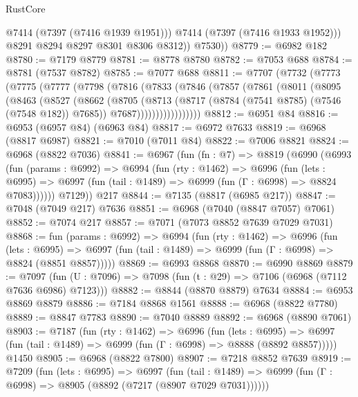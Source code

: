 \begin{lexlean}{RustCore}
\begin{coremodule}
                @7414
                (@7397 (@7416 @1939 @1951)))
              @7414
              (@7397 (@7416 @1933 @1952)))
            @8291
            @8294
            @8297
            @8301
            @8306
            @8312))
        @7530))
@8779 := @6982 @182
@8780 := @7179 @8779
@8781 := @8778 @8780
@8782 := @7053 @688
@8784 := @8781 (@7537 @8782)
@8785 := @7077 @688
@8811 := @7707
    (@7732
      (@7773
        (@7775
          (@7777
            (@7798
              (@7816
                (@7833
                  (@7846
                    (@7857
                      (@7861
                        (@8011
                          (@8095
                            (@8463
                              (@8527
                                (@8662
                                  (@8705
                                    (@8713
                                      (@8717 (@8784 (@7541 @8785) (@7546 (@7548 @182)) @7685))
                                      @7687)))))))))))))))))
@8812 := @6951 @84
@8816 := @6953 (@6957 @84) (@6963 @84)
@8817 := @6972 @7633
@8819 := @6968 (@8817 @6987)
@8821 := @7010 (@7011 @84)
@8822 := @7006 @8821
@8824 := @6968 (@8822 @7036)
@8841 := @6967
    (fun (fn : @7) =>
    @8819
      (@6990
        (@6993
          (fun (params : @6992) =>
          @6994
            (fun (rty : @1462) =>
            @6996
              (fun (lets : @6995) =>
              @6997 (fun (tail : @1489) => @6999 (fun (Γ : @6998) => @8824 @7083))))))
        @7129))
    @217
@8844 := @7135 (@8817 (@6985 @217))
@8847 := @7048 (@7049 @217) @7636
@8851 := @6968 (@7040 (@8847 @7057) @7061)
@8852 := @7074 @217
@8857 := @7071 (@7073 @8852 @7639 @7029 @7031)
@8868 := fun (params : @6992) =>
  @6994
    (fun (rty : @1462) =>
    @6996
      (fun (lets : @6995) =>
      @6997 (fun (tail : @1489) => @6999 (fun (Γ : @6998) => @8824 (@8851 @8857)))))
@8869 := @6993 @8868
@8870 := @6990 @8869
@8879 := @7097 (fun (U : @7096) => @7098 (fun (t : @29) => @7106 (@6968 (@7112 @7636 @6986) @7123)))
@8882 := @8844 (@8870 @8879) @7634
@8884 := @6953 @8869 @8879
@8886 := @7184 @8868 @1561
@8888 := @6968 (@8822 @7780)
@8889 := @8847 @7783
@8890 := @7040 @8889
@8892 := @6968 (@8890 @7061)
@8903 := @7187
    (fun (rty : @1462) =>
    @6996
      (fun (lets : @6995) =>
      @6997 (fun (tail : @1489) => @6999 (fun (Γ : @6998) => @8888 (@8892 @8857)))))
    @1450
@8905 := @6968 (@8822 @7800)
@8907 := @7218 @8852 @7639
@8919 := @7209
    (fun (lets : @6995) =>
    @6997
      (fun (tail : @1489) => @6999 (fun (Γ : @6998) => @8905 (@8892 (@7217 (@8907 @7029 @7031))))))

\end{coremodule}
\end{lexlean}
